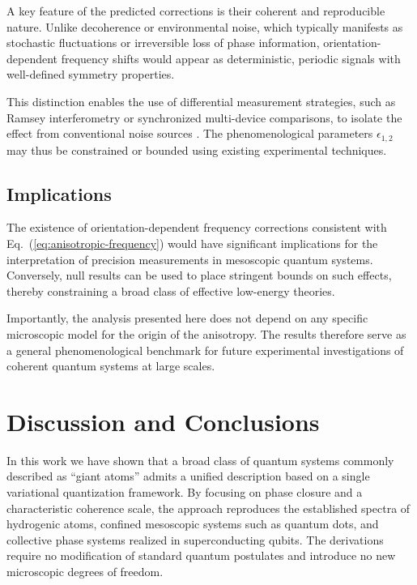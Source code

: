 \documentclass[11pt]{article}
\begin{document}
            A key feature of the predicted corrections is their coherent and reproducible nature. Unlike decoherence or environmental noise, which typically manifests as stochastic fluctuations or irreversible loss of phase information, orientation-dependent frequency shifts would appear as deterministic, periodic signals with well-defined symmetry properties.

            This distinction enables the use of differential measurement strategies, such as Ramsey interferometry or synchronized multi-device comparisons, to isolate the effect from conventional noise sources \cite{Wineland1994}. The phenomenological parameters $\epsilon_{1,2}$ may thus be constrained or bounded using existing experimental techniques.

        \subsection{Implications}

            The existence of orientation-dependent frequency corrections consistent with Eq.~(\ref{eq:anisotropic-frequency}) would have significant implications for the interpretation of precision measurements in mesoscopic quantum systems. Conversely, null results can be used to place stringent bounds on such effects, thereby constraining a broad class of effective low-energy theories.

            Importantly, the analysis presented here does not depend on any specific microscopic model for the origin of the anisotropy. The results therefore serve as a general phenomenological benchmark for future experimental investigations of coherent quantum systems at large scales.

    \section{Discussion and Conclusions}

        In this work we have shown that a broad class of quantum systems commonly described as ``giant atoms'' admits a unified description based on a single variational quantization framework. By focusing on phase closure and a characteristic coherence scale, the approach reproduces the established spectra of hydrogenic atoms, confined mesoscopic systems such as quantum dots, and collective phase systems realized in superconducting qubits. The derivations require no modification of standard quantum postulates and introduce no new microscopic degrees of freedom.
\end{document}
